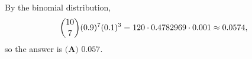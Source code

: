 By the binomial distribution,
\[\dbinom{10}{7}(0.9)^7(0.1)^3=120\cdot0.4782969\cdot0.001\approx0.0574,\]
so the answer is $\boxed{\textbf{(A) } 0.057}$.
